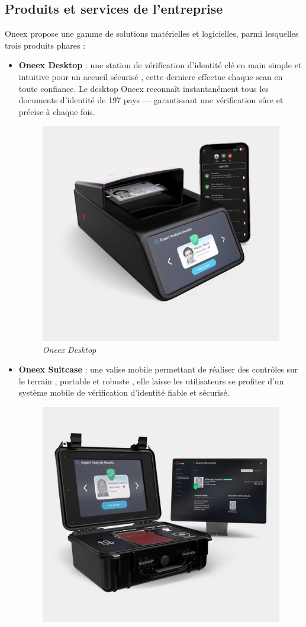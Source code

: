 \subsection{Produits et services de l'entreprise}

Oneex propose une gamme de solutions matérielles et logicielles, parmi lesquelles trois produits phares :

\begin{itemize}
	\item \textbf{Oneex Desktop} : une station de vérification d’identité clé en main simple et intuitive pour un accueil sécurisé , cette derniere effectue chaque scan en toute confiance. Le desktop Oneex reconnaît instantanément tous les documents d'identité de 197 pays — garantissant une vérification sûre et précise à chaque fois.
	      \begin{figure}[ht]
		      \centering
		      \includegraphics[width=.5\textwidth]{figures/Oneex desktop.png}
		      \caption{\textit{Oneex Desktop}}
		      \label{fig:Oneex desktop}
	      \end{figure}
	\item \textbf{Oneex Suitcase} : une valise mobile permettant de réaliser des contrôles sur le terrain , portable et robuste , elle laisse les utilisateurs se profiter d’un système mobile de vérification d’identité fiable et sécurisé.
	      \begin{figure}[ht]
		      \centering
		      \includegraphics[width=.5\textwidth]{figures/Oneex suitcase.png}

\end{figure}
\end{itemize}
